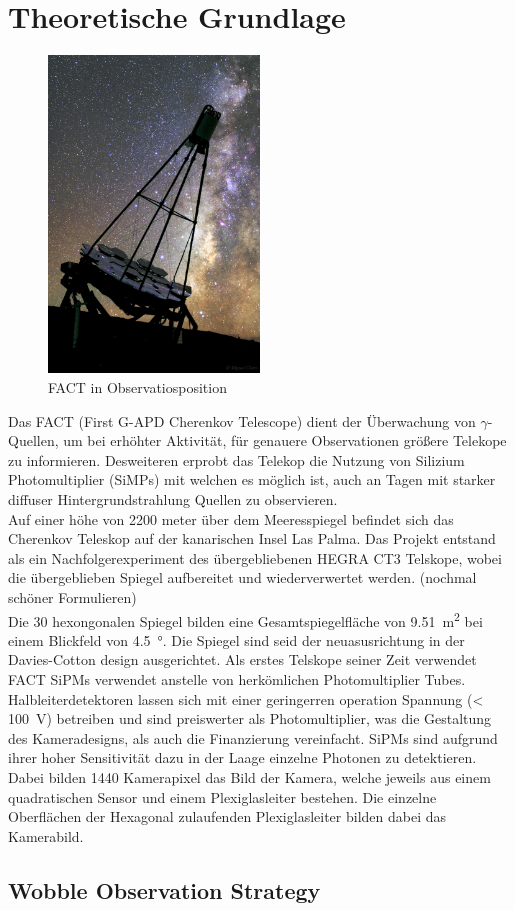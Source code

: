 \chapter{Theoretische Grundlage}
\begin{figure}

  \includegraphics[width=0.5\textwidth]{./logos/FACT.jpg}
  \caption{FACT in Observatiosposition}
  \label{fig:observ}

\end{figure}
Das FACT (First G-APD Cherenkov Telescope) dient der Überwachung von $\gamma$-Quellen, um bei erhöhter Aktivität, für genauere Observationen größere Telekope zu informieren. Desweiteren erprobt das Telekop die Nutzung von Silizium Photomultiplier (SiMPs) mit welchen es möglich ist, auch an Tagen mit starker diffuser Hintergrundstrahlung Quellen zu observieren. \\

Auf einer höhe von 2200 meter über dem Meeresspiegel befindet sich das Cherenkov Teleskop auf der kanarischen Insel Las Palma. Das Projekt entstand als ein Nachfolgerexperiment des übergebliebenen HEGRA CT3 Telskope, wobei die übergeblieben Spiegel aufbereitet und wiederverwertet werden. (nochmal schöner Formulieren)\\

Die 30 hexongonalen Spiegel bilden eine Gesamtspiegelfläche von \SI{9.51}{\meter\squared} bei einem Blickfeld von \SI{4.5}{\degree}. Die Spiegel sind seid der neuasusrichtung in der Davies-Cotton design ausgerichtet. \cite{??} 
Als erstes Telskope seiner Zeit verwendet FACT SiPMs verwendet anstelle von herkömlichen Photomultiplier Tubes. Halbleiterdetektoren lassen sich mit einer geringerren operation Spannung (< \SI{100}{\volt}) betreiben und sind preiswerter als Photomultiplier, was die Gestaltung des Kameradesigns, als auch die Finanzierung vereinfacht. SiPMs sind aufgrund ihrer hoher Sensitivität dazu in der Laage einzelne Photonen zu detektieren.
Dabei bilden 1440 Kamerapixel das Bild der Kamera, welche jeweils aus einem quadratischen Sensor und einem Plexiglasleiter bestehen. Die einzelne Oberflächen der Hexagonal zulaufenden Plexiglasleiter bilden dabei das Kamerabild.


\section{Wobble Observation Strategy}
